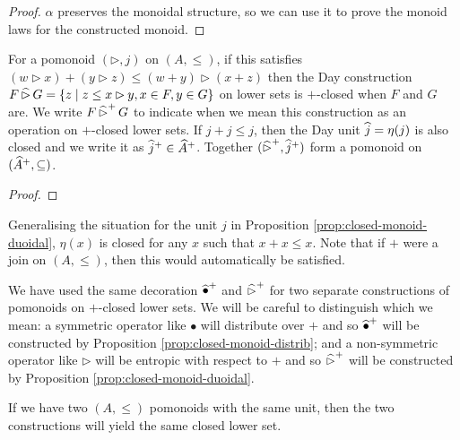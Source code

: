 \begin{proof}
  $\alpha$ preserves the monoidal structure, so we can use it to prove
  the monoid laws for the constructed monoid.

\end{proof}

\begin{proposition}\label{prop:closed-monoid-duoidal}
  For a pomonoid $(\rhd, j)$ on $(A, \leq)$, if this satisfies
  $(w \rhd x) + (y \rhd z) \leq (w + y) \rhd (x + z)$ then the Day
  construction
  $F \mathop{\widehat{\rhd}} G = \{ z \mid z \leq x \rhd y, x \in F, y \in G \}$ on
  lower sets is $+$-closed when $F$ and $G$ are. We write
  $F \mathop{\widehat{\rhd}^+} G$ to indicate when we mean this construction as
  an operation on $+$-closed lower sets. If $j + j \leq j$, then the
  Day unit $\mathop{\widehat{j}} = \eta(j)$ is also closed and we write it as
  $\mathop{\widehat{j}^+} \in \widehat{A}^+$. Together
  $(\mathop{\widehat{\rhd}^+}, \mathop{\widehat{j}^+})$ form a pomonoid on
  $(\widehat{A}^+, \subseteq)$.
\end{proposition}

\begin{proof}
\end{proof}

\begin{remark}
  Generalising the situation for the unit $j$ in Proposition
  \ref{prop:closed-monoid-duoidal}, $\eta(x)$ is closed for any $x$
  such that $x + x \leq x$. Note that if $+$ were a join on
  $(A, \leq)$, then this would automatically be satisfied.
\end{remark}

\begin{remark}
  We have used the same decoration $\mathop{\widehat{\bullet}^+}$ and
  $\mathop{\widehat{\rhd}^+}$ for two separate constructions of pomonoids on
  $+$-closed lower sets. We will be careful to distinguish which we
  mean: a symmetric operator like $\bullet$ will distribute over $+$
  and so $\mathop{\widehat{\bullet}^+}$ will be constructed by Proposition
  \ref{prop:closed-monoid-distrib}; and a non-symmetric operator like
  $\rhd$ will be entropic with respect to $+$ and so
  $\mathop{\widehat{\rhd}^+}$ will be constructed by Proposition
  \ref{prop:closed-monoid-duoidal}.
\end{remark}

\begin{remark}
  If we have two $(A, \leq)$ pomonoids with the same unit, then the
  two constructions will yield the same closed lower set.
\end{remark}

